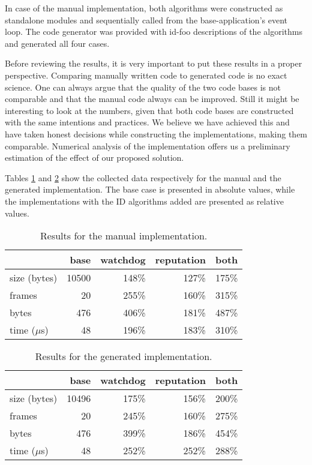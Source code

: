\documentclass[conference]{IEEEtran}
\newcommand{\NAME}{id-foo\xspace}
\begin{document}
In case of the manual implementation, both algorithms were constructed as
standalone modules and sequentially called from the base-application's event
loop. The code generator was provided with \NAME descriptions of the algorithms
and generated all four cases.

Before reviewing the results, it is very important to put these results in a
proper perspective. Comparing manually written code to generated code is no
exact science. One can always argue that the quality of the two code bases is
not comparable and that the manual code always can be improved. Still it might
be interesting to look at the numbers, given that both code bases are
constructed with the same intentions and practices. We believe we have achieved
this and have taken honest decisions while constructing the implementations,
making them comparable. Numerical analysis of the implementation offers us a
preliminary estimation of the effect of our proposed solution.

Tables \ref{tbl:manual} and \ref{tbl:generated} show the collected data
respectively for the manual and the generated implementation. The base case is
presented in absolute values, while the implementations with the ID algorithms
added are presented as relative values.

\begin{table}[H]
  \centering
  \begin{tabular}{lrrrr}
  \hline
      & base & watchdog & reputation & both\\
  \hline
  size (bytes) & 10500 & 148\% & 127\% & 175\%\\
  frames & 20 & 255\% & 160\% & 315\%\\
  bytes & 476 & 406\% & 181\% & 487\%\\
  time ($\mu$s) & 48 & 196\% & 183\% & 310\%\\
  \hline
  \end{tabular}
  \caption{Results for the manual implementation.}
  \label{tbl:manual}
\end{table}

\begin{table}[H]
  \centering
  \begin{tabular}{lrrrr}
  \hline
         & base & watchdog & reputation & both\\
  \hline
  size (bytes) & 10496 & 175\% & 156\% & 200\%\\
  frames & 20 & 245\% & 160\% & 275\%\\
  bytes & 476 & 399\% & 186\% & 454\%\\
  time ($\mu$s) & 48 & 252\% & 252\% & 288\%\\
  \hline
  \end{tabular}
  \caption{Results for the generated implementation.}
  \label{tbl:generated}
\end{table}
\end{document}
